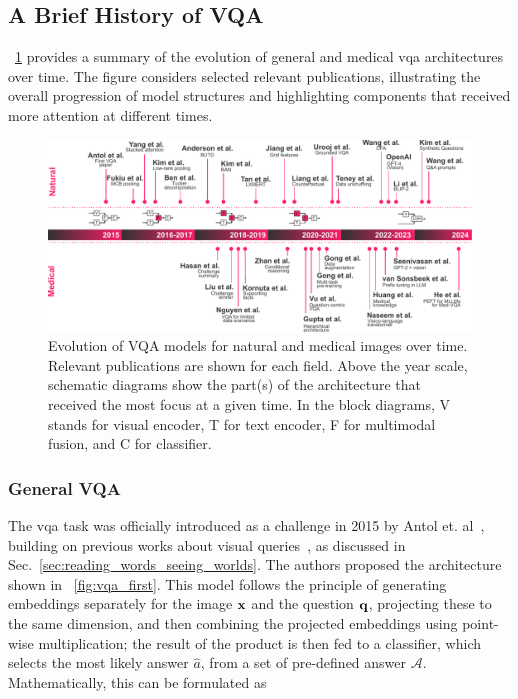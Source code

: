 \subsection{A Brief History of VQA}
\label{subsec:vqa_history}

\fig~\ref{fig:vqa_evolution_background} provides a summary of the evolution of general and medical \gls{vqa} architectures over time. The figure considers selected relevant publications, illustrating the overall progression of model structures and highlighting components that received more attention at different times.

\begin{figure}[!ht]
\begin{center}
\includegraphics[width=\textwidth]{Figures/Background/vqa_evolution_background.pdf}
\caption{Evolution of VQA models for natural and medical images over time. Relevant publications are shown for each field. Above the year scale, schematic diagrams show the part(s) of the architecture that received the most focus at a given time. In the block diagrams, V stands for visual encoder, T for text encoder, F for multimodal fusion, and C for classifier.}
\label{fig:vqa_evolution_background}
\end{center}
\end{figure}

\subsubsection{General VQA}

The \gls{vqa} task was officially introduced as a challenge in 2015 by Antol et. al~\cite{antol2015vqa}, building on previous works about visual queries~\cite{bigham2010vizwiz,malinowski2014multi,tu2014joint,geman2015visual}, as discussed in Sec.~\ref{sec:reading_words_seeing_worlds}. The authors proposed the architecture shown in \fig~\ref{fig:vqa_first}. This model follows the principle of generating embeddings separately for the image $\mathbf{x}$ and the question $\mathbf{q}$, projecting these to the same dimension, and then combining the projected embeddings using point-wise multiplication; the result of the product is then fed to a classifier, which selects the most likely answer $\hat{a}$, from a set of pre-defined answer $\mathcal{A}$. Mathematically, this can be formulated as

